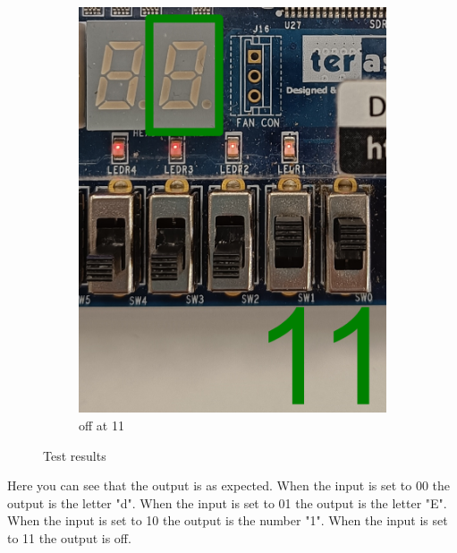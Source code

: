 \documentclass{article}
\begin{document}
\begin{figure}[h]
\begin{subfigure}{0.4\textwidth}
        \includegraphics[width=1\textwidth]{Figures/Part4_11.png}
        \caption{off at 11}
        \label{fig:T04pic4}
    \end{subfigure}
    \caption{Test results}
    \label{fig:T04pic}
\end{figure}
Here you can see that the output is as expected. When the input is set to 00 the output is the letter "d". When the input is set to 01 the output is the letter "E". When the input is set to 10 the output is the number "1". When the input is set to 11 the output is off.

\end{document}
